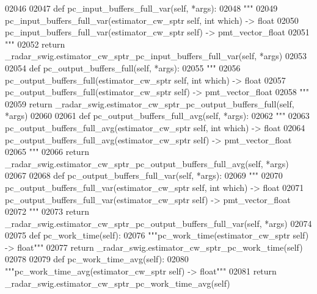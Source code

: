 \begin{DoxyCode}
{{{{{{{{02046 
02047     \textcolor{keyword}{def }pc_input_buffers_full_var(self, *args):
02048         \textcolor{stringliteral}{"""}
02049 \textcolor{stringliteral}{        pc\_input\_buffers\_full\_var(estimator\_cw\_sptr self, int which) -> float}
02050 \textcolor{stringliteral}{        pc\_input\_buffers\_full\_var(estimator\_cw\_sptr self) -> pmt\_vector\_float}
02051 \textcolor{stringliteral}{        """}
02052         \textcolor{keywordflow}{return} \_radar\_swig.estimator\_cw\_sptr\_pc\_input\_buffers\_full\_var(self, *args)
02053 
02054     \textcolor{keyword}{def }pc_output_buffers_full(self, *args):
02055         \textcolor{stringliteral}{"""}
02056 \textcolor{stringliteral}{        pc\_output\_buffers\_full(estimator\_cw\_sptr self, int which) -> float}
02057 \textcolor{stringliteral}{        pc\_output\_buffers\_full(estimator\_cw\_sptr self) -> pmt\_vector\_float}
02058 \textcolor{stringliteral}{        """}
02059         \textcolor{keywordflow}{return} \_radar\_swig.estimator\_cw\_sptr\_pc\_output\_buffers\_full(self, *args)
02060 
02061     \textcolor{keyword}{def }pc_output_buffers_full_avg(self, *args):
02062         \textcolor{stringliteral}{"""}
02063 \textcolor{stringliteral}{        pc\_output\_buffers\_full\_avg(estimator\_cw\_sptr self, int which) -> float}
02064 \textcolor{stringliteral}{        pc\_output\_buffers\_full\_avg(estimator\_cw\_sptr self) -> pmt\_vector\_float}
02065 \textcolor{stringliteral}{        """}
02066         \textcolor{keywordflow}{return} \_radar\_swig.estimator\_cw\_sptr\_pc\_output\_buffers\_full\_avg(self, *args)
02067 
02068     \textcolor{keyword}{def }pc_output_buffers_full_var(self, *args):
02069         \textcolor{stringliteral}{"""}
02070 \textcolor{stringliteral}{        pc\_output\_buffers\_full\_var(estimator\_cw\_sptr self, int which) -> float}
02071 \textcolor{stringliteral}{        pc\_output\_buffers\_full\_var(estimator\_cw\_sptr self) -> pmt\_vector\_float}
02072 \textcolor{stringliteral}{        """}
02073         \textcolor{keywordflow}{return} \_radar\_swig.estimator\_cw\_sptr\_pc\_output\_buffers\_full\_var(self, *args)
02074 
02075     \textcolor{keyword}{def }pc_work_time(self):
02076         \textcolor{stringliteral}{"""pc\_work\_time(estimator\_cw\_sptr self) -> float"""}
02077         \textcolor{keywordflow}{return} \_radar\_swig.estimator\_cw\_sptr\_pc\_work\_time(self)
02078 
02079     \textcolor{keyword}{def }pc_work_time_avg(self):
02080         \textcolor{stringliteral}{"""pc\_work\_time\_avg(estimator\_cw\_sptr self) -> float"""}
02081         \textcolor{keywordflow}{return} \_radar\_swig.estimator\_cw\_sptr\_pc\_work\_time\_avg(self)
}}}}}}}}
\end{DoxyCode}
